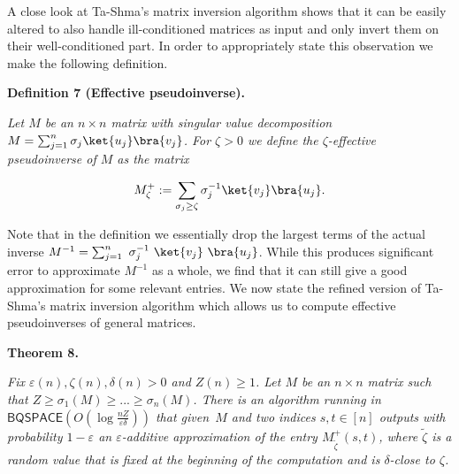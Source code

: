 A close look at Ta-Shma’s matrix inversion algorithm shows that it can be easily altered to also handle ill-conditioned matrices as input and only invert them on their well-conditioned part.
In order to appropriately state this observation we make the following definition.\par





\par\medskip\noindent\textbf{
\textbf{Definition 7}\textbf{ }(Effective pseudoinverse)\textbf{.}
}\par



\emph{Let $M$ be an $n\times n$ matrix with singular value decomposition $M=\sum_{j=1}^{n}\sigma_{j}\ket{u_{j}}\bra{v_{j}}$. For $\zeta>0$ we define the $\zeta$-effective pseudoinverse of $M$ as the matrix}\par


\[\begin{gathered}
\displaystyle M_{\zeta}^{+}:=\sum_{\sigma_{j}\geq\zeta}\sigma_{j}^{-1}\ket{v_{j}}\bra{u_{j}}.
\end{gathered}\]






Note that in the definition we essentially drop the largest terms of the actual inverse $M^{-1}=\sum_{j=1}^{n}\nobreak\ \sigma_{j}^{-1}\nobreak\ \ket{v_{j}}\nobreak\ \bra{u_{j}}$.
While this produces significant error to approximate $M^{-1}$ as a whole, we find that it can still give a good approximation for some relevant entries. We now state the refined version of Ta-Shma’s matrix inversion algorithm which allows us to compute effective pseudoinverses of general matrices.\par





\par\medskip\noindent\textbf{
\textbf{Theorem 8}\textbf{.}
}\par



\emph{Fix $\varepsilon(n),\zeta(n),\delta(n)>0$ and $Z(n)\geq 1$.
Let $M$ be an $n\times n$ matrix such that $Z\geq\sigma_{1}(M)\geq...\geq\sigma_{n}(M)$.
There is an algorithm running in $\mathsf{BQSPACE}(O(\log\frac{nZ}{\varepsilon\delta}))$ that given $M$ and two indices $s,t\in[n]$ outputs with probability $1-\varepsilon$ an $\varepsilon$-additive approximation of the entry $M_{\widetilde{\zeta}}^{+}(s,t)$,
where $\widetilde{\zeta}$ is a random value that is fixed at the beginning of the computation and is $\delta$-close to $\zeta$.}\par



